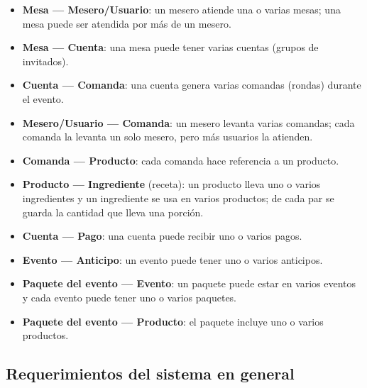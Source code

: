 \begin{itemize}
    \item \textbf{Mesa --- Mesero/Usuario}: un mesero atiende una o varias mesas; una mesa puede ser atendida por más de un mesero.
    \item \textbf{Mesa --- Cuenta}: una mesa puede tener varias cuentas (grupos de invitados).
    \item \textbf{Cuenta --- Comanda}: una cuenta genera varias comandas (rondas) durante el evento.
    \item \textbf{Mesero/Usuario --- Comanda}: un mesero levanta varias comandas; cada comanda la levanta un solo mesero, pero más usuarios la atienden.
    \item \textbf{Comanda --- Producto}: cada comanda hace referencia a un producto.
    \item \textbf{Producto --- Ingrediente} (receta): un producto lleva uno o varios ingredientes y un ingrediente se usa en varios productos; de cada par se guarda la cantidad que lleva una porción.
    \item \textbf{Cuenta --- Pago}: una cuenta puede recibir uno o varios pagos.
    \item \textbf{Evento --- Anticipo}: un evento puede tener uno o varios anticipos.
    \item \textbf{Paquete del evento --- Evento}: un paquete puede estar en varios eventos y cada evento puede tener uno o varios paquetes.
    \item \textbf{Paquete del evento --- Producto}: el paquete incluye uno o varios productos.
\end{itemize}

\newpage

\subsection{Requerimientos del sistema en general}


